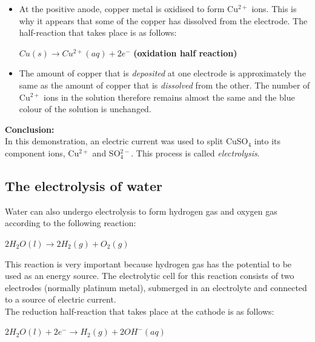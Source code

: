 {\begin{itemize}
{\begin{center}
\rm${Cu^{2+}(aq) + 2e^{-} \rightarrow Cu(s)}$ \textbf{(reduction half reaction)}
\end{center}
}

\item{At the positive anode, copper metal is oxidised to form Cu$^{2+}$ ions. This is why it appears that some of the copper has dissolved from the electrode. The half-reaction that takes place is as follows:

\begin{center}
\rm${Cu(s) \rightarrow Cu^{2+}(aq) + 2e^{-}}$ \textbf{(oxidation half reaction)}
\end{center}
}

\item{The amount of copper that is \textit{deposited} at one electrode is approximately the same as the amount of copper that is \textit{dissolved} from the other. The number of Cu$^{2+}$ ions in the solution therefore remains almost the same and the blue colour of the solution is unchanged.}
\end{itemize}

\textbf{Conclusion:}\\

In this demonstration, an electric current was used to split CuSO$_{4}$ into its component ions, Cu$^{2+}$ and SO$_{4}^{2-}$. This process is called \textit{electrolysis}.

}

\subsection{The electrolysis of water}

Water can also undergo electrolysis to form hydrogen gas and oxygen gas according to the following reaction:

\begin{center}
\rm${2H_{2}O(l) \rightarrow 2H_{2}(g) + O_{2}(g)}$
\end{center}

This reaction is very important because hydrogen gas has the potential to be used as an energy source. The electrolytic cell for this reaction consists of two electrodes (normally platinum metal), submerged in an electrolyte and connected to a source of electric current.\\

The reduction half-reaction that takes place at the cathode is as follows:
\begin{center}
\rm${2H_{2}O(l) + 2e^{-} \rightarrow H_{2}(g) + 2OH^{-}(aq)}$
\end{center}

